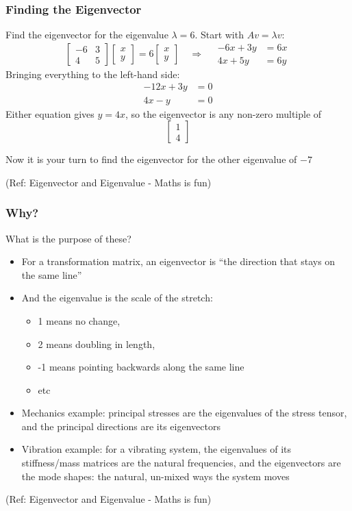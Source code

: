 \begin{frame}[fragile]\frametitle{Finding the Eigenvector}
Find the eigenvector for the eigenvalue $\lambda = 6$. Start with $Av = \lambda v$:
\[
\begin{bmatrix} -6 & 3 \\ 4 & 5 \end{bmatrix}
\begin{bmatrix} x \\ y \end{bmatrix}
= 6
\begin{bmatrix} x \\ y \end{bmatrix}
\quad\Rightarrow\quad
\begin{aligned} -6x + 3y &= 6x \\ 4x + 5y &= 6y \end{aligned}
\]
Bringing everything to the left-hand side:
\[
\begin{aligned} -12x + 3y &= 0 \\ 4x - y &= 0 \end{aligned}
\]
Either equation gives $y = 4x$, so the eigenvector is any non-zero multiple of
\[
\begin{bmatrix} 1 \\ 4 \end{bmatrix}
\]

Now it is your turn to find the eigenvector for the other eigenvalue of $-7$

{\tiny (Ref: Eigenvector and Eigenvalue - Maths is fun)}
\end{frame}

\begin{frame}[fragile]\frametitle{Why?}
What is the purpose of these?

\begin{itemize}
\item For a transformation matrix, an eigenvector is ``the direction that stays on the same line''
\item And the eigenvalue is the scale of the stretch:
\begin{itemize}
\item 1 means no change,
\item 2 means doubling in length,
\item -1 means pointing backwards along the same line
\item etc
\end{itemize}
\item Mechanics example: principal stresses are the eigenvalues of the stress tensor, and the principal directions are its eigenvectors
\item Vibration example: for a vibrating system, the eigenvalues of its stiffness/mass matrices are the natural frequencies, and the eigenvectors are the mode shapes: the natural, un-mixed ways the system moves
\end{itemize}

{\tiny (Ref: Eigenvector and Eigenvalue - Maths is fun)}
\end{frame}

